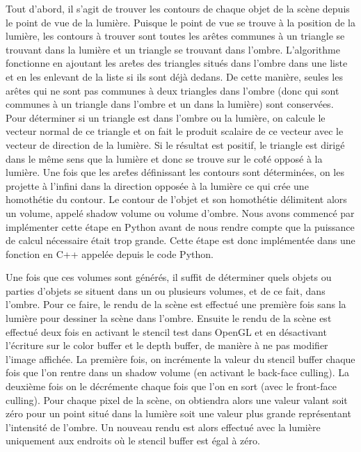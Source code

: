 \documentclass[a4paper,10pt]{report}
\begin{document}
Tout d'abord, il s'agit de trouver les contours de chaque objet de la scène depuis le point de vue de la lumière. 
Puisque le point de vue se trouve à la position de la lumière, les contours à trouver sont toutes les arêtes communes à un triangle se trouvant dans la lumière et un triangle se trouvant dans l'ombre. 
L'algorithme fonctionne en ajoutant les are\^tes des triangles situés dans l'ombre dans une liste et en les enlevant de la liste si ils sont déjà dedans.
De cette manière, seules les arêtes qui ne sont pas communes à deux triangles dans l'ombre (donc qui sont communes à un triangle dans l'ombre et un dans la lumière) sont conservées.
Pour déterminer si un triangle est dans l'ombre ou la lumière, on calcule le vecteur normal de ce triangle et on fait le produit scalaire de ce vecteur avec le vecteur de direction de la lumière. Si le résultat est positif, le triangle est dirigé dans le même sens que la lumière et donc se trouve sur le co\^té opposé à la lumière.
Une fois que les are\^tes définissant les contours sont déterminées, on les projette à l'infini dans la direction opposée à la lumière ce qui crée une homothétie du contour. Le contour de l'objet et son homothétie délimitent alors un volume, appelé shadow volume ou volume d'ombre. 
Nous avons commencé par implémenter cette étape en Python avant de nous rendre compte que la puissance de calcul nécessaire était trop grande.
Cette étape est donc implémentée dans une fonction en C++ appelée depuis le code Python.

Une fois que ces volumes sont générés, il suffit de déterminer quels objets ou parties d'objets se situent dans un ou plusieurs volumes, et de ce fait, dans l'ombre. 
Pour ce faire, le rendu de la scène est effectué une première fois sans la lumière pour dessiner la scène dans l'ombre.
Ensuite le rendu de la scène est effectué deux fois en activant le stencil test dans OpenGL et en désactivant l'écriture sur le color buffer et le depth buffer, de manière à ne pas modifier l'image affichée. La première fois, on incrémente la valeur du stencil buffer chaque fois que l'on rentre dans un shadow volume (en activant le back-face culling). La deuxième fois on le décrémente chaque fois que l'on en sort (avec le front-face culling). Pour chaque pixel de la scène, on obtiendra alors une valeur valant soit zéro pour un point situé dans la lumière soit une valeur plus grande représentant l'intensité de l'ombre.
Un nouveau rendu est alors effectué avec la lumière uniquement aux endroits où le stencil buffer est égal à zéro.
\end{document}

